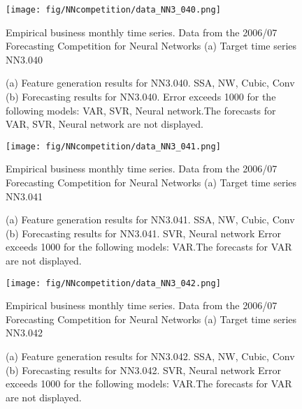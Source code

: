 \documentclass[12pt]{article}
\begin{document}
\begin{figure}
\centering
\texttt{[image: fig/NNcompetition/data\_NN3\_040.png]}
\caption{Empirical business monthly time series. Data from the 2006/07 Forecasting Competition for Neural Networks	(a) Target time series	NN3.040	}
\end{figure}


\begin{figure}
\centering
{}
\caption{(a)	Feature generation results for	NN3.040.	SSA, NW, Cubic, Conv	(b)	Forecasting results for	NN3.040.		Error exceeds 1000 for the following models: VAR, SVR, Neural network.The forecasts for VAR, SVR, Neural network are not displayed.	}
\end{figure}


\begin{figure}
\centering
\texttt{[image: fig/NNcompetition/data\_NN3\_041.png]}
\caption{Empirical business monthly time series. Data from the 2006/07 Forecasting Competition for Neural Networks	(a) Target time series	NN3.041	}
\end{figure}


\begin{figure}
\centering
{}
\caption{(a)	Feature generation results for	NN3.041.	SSA, NW, Cubic, Conv	(b)	Forecasting results for	NN3.041.	SVR, Neural network	Error exceeds 1000 for the following models: VAR.The forecasts for VAR are not displayed.	}
\end{figure}


\begin{figure}
\centering
\texttt{[image: fig/NNcompetition/data\_NN3\_042.png]}
\caption{Empirical business monthly time series. Data from the 2006/07 Forecasting Competition for Neural Networks	(a) Target time series	NN3.042	}
\end{figure}


\begin{figure}
\centering
{}
\caption{(a)	Feature generation results for	NN3.042.	SSA, NW, Cubic, Conv	(b)	Forecasting results for	NN3.042.	SVR, Neural network	Error exceeds 1000 for the following models: VAR.The forecasts for VAR are not displayed.	}
\end{figure}
\end{document}
